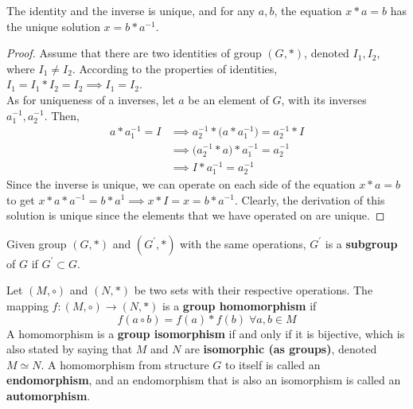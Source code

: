   \begin{proposition}
    The identity and the inverse is unique, and for any $a, b$, the equation $x*a = b$ has the unique solution $x = b* a^{-1}$.
  \end{proposition}
  \begin{proof}
     Assume that there are two identities of group $(G,*)$, denoted $I_{1}, I_{2}$, where $I_{1} \neq I_{2}$. According to the properties of identities, $I_{1} = I_{1} * I_{2} = I_{2} \implies I_{1} = I_{2}$. \\
    As for uniqueness of a inverses, let $a$ be an element of $G$, with its inverses $a_{1}^{-1}, a_{2}^{-1}$. Then, 
    \begin{align*}
      a * a_{1}^{-1} = I & \implies a_{2}^{-1} * \Big(a * a_{1}^{-1} \Big)= a_{2}^{-1} * I \\
       & \implies \Big(a_{2}^{-1} * a \Big) * a_{1}^{-1} = a_{2}^{-1} \\
       & \implies I * a_{1}^{-1} = a_{2}^{-1}
    \end{align*}
    Since the inverse is unique, we can operate on each side of the equation $x*a = b$ to get $x*a*a^{-1} = b*a^{1} \implies x * I = x = b*a^{-1}$. Clearly, the derivation of this solution is unique since the elements that we have operated on are unique.
  \end{proof} 

  \begin{definition}[Subgroup]
    Given group $(G, \ast)$ and $(G^\prime, \ast)$ with the same operations, $G^\prime$ is a \textbf{subgroup} of $G$ if $G^\prime \subset G$. 
  \end{definition}

  \begin{definition}
    Let $(M, \circ)$ and $(N, *)$ be two sets with their respective operations. The mapping $f: (M, \circ) \longrightarrow (N, *)$ is a \textbf{group homomorphism} if
    \begin{equation}
      f(a \circ b) = f(a) * f(b) \; \forall a, b \in M
    \end{equation}
    A homomorphism is a \textbf{group isomorphism} if and only if it is bijective, which is also stated by saying that $M$ and $N$ are \textbf{isomorphic (as groups)}, denoted $M \simeq N$. A homomorphism from structure $G$ to itself is called an \textbf{endomorphism}, and an endomorphism that is also an isomorphism is called an \textbf{automorphism}. 
  \end{definition}

